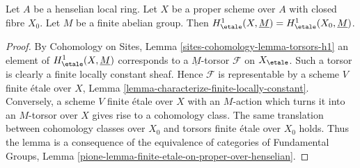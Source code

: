 \begin{lemma}
\label{lemma-proper-over-henselian-and-h1}
Let $A$ be a henselian local ring. Let $X$ be a proper scheme over $A$
with closed fibre $X_0$. Let $M$ be a finite abelian group.
Then $H^1_\etale(X, \underline{M}) = H^1_\etale(X_0, \underline{M})$.
\end{lemma}

\begin{proof}
By Cohomology on Sites, Lemma \ref{sites-cohomology-lemma-torsors-h1}
an element of $H^1_\etale(X, \underline{M})$ corresponds to a
$\underline{M}$-torsor $\mathcal{F}$ on $X_\etale$.
Such a torsor is clearly a finite locally constant sheaf.
Hence $\mathcal{F}$ is representable by a scheme $V$ finite
\'etale over $X$, Lemma \ref{lemma-characterize-finite-locally-constant}.
Conversely, a scheme $V$ finite \'etale over $X$ with an $M$-action
which turns it into an $M$-torsor over $X$ gives rise to a cohomology
class. The same translation between cohomology classes over $X_0$ and
torsors finite \'etale over $X_0$ holds. Thus the lemma
is a consequence of the equivalence of categories of
Fundamental Groups, Lemma
\ref{pione-lemma-finite-etale-on-proper-over-henselian}.
\end{proof}
